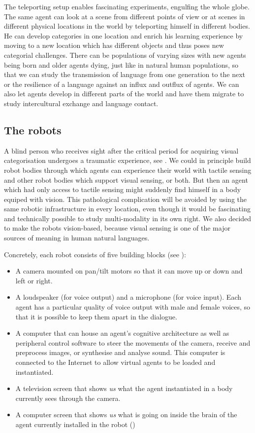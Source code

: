 The teleporting setup enables  fascinating 
experiments, engulfing the 
whole globe. The same agent can look at a scene from
different points of view or at scenes in different
physical locations in the world by teleporting himself in different 
bodies. He can develop categories in one location
and enrich his learning experience by moving to a new 
location which has different objects and thus poses new 
categorial challenges.
There can be populations of varying sizes with new 
agents being born and older agents dying, just like in 
natural human populations, so that we can study the 
transmission of language from one generation to the next
or the resilience of a language against an influx and 
outflux of agents. We can also let agents develop in
different parts of the world and have them migrate to
study intercultural exchange and language contact. 

\subsection{The robots}

A blind person who receives sight after the critical 
period for acquiring visual categorisation undergoes a 
traumatic experience, see \cite{Zeki:1993}. 
We could in principle build robot bodies
through which agents can experience their world with tactile
sensing and other robot bodies which support visual sensing, or both. 
But then an agent which had only access to tactile
sensing might suddenly find himself in a body equiped with 
vision. This pathological complication will 
be avoided by using the same robotic infrastructure
in every location, even though it would be fascinating and 
technically possible to study multi-modality in its 
own right. 
We also decided to make the robots vision-based, because visual 
sensing is one of the major sources of meaning in
human natural languages. 

Concretely, each robot consists of five building blocks (see ):
\enlargethispage{1\baselineskip}
\begin{itemize}
\item A camera mounted on pan/tilt motors so that it can move 
up or down and left or right. 
\item A loudspeaker (for voice output) and a microphone (for 
voice input). Each agent has a particular quality of voice
output with male and female voices, so that it is possible 
to keep them apart in the dialogue. 
\item A computer that can house an agent's 
cognitive architecture as well as peripheral 
control software to steer the movements of the camera, 
receive and preprocess images, or synthesise and analyse 
sound. This computer is connected 
to the Internet to allow virtual agents to be loaded and instantiated. 
\item A television screen that shows {\itshape us} what the agent
instantiated in a body currently sees through the camera. 
\item A computer screen that shows {\itshape us} what is going on inside
the brain of the agent currently installed in the robot ()
\end{itemize}


